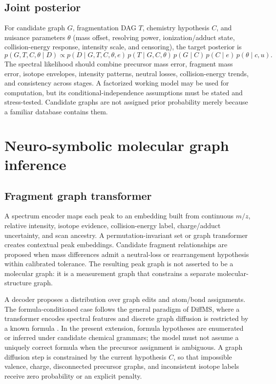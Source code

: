 \documentclass[10pt,a4paper]{article}
\begin{document}
\subsection{Joint posterior}
For candidate graph $G$, fragmentation DAG $T$, chemistry hypothesis $C$, and nuisance parameters $\theta$ (mass offset, resolving power, ionization/adduct state, collision-energy response, intensity scale, and censoring), the target posterior is
\begin{equation}
 p(G,T,C,\theta\mid D) \propto p(D\mid G,T,C,\theta,e)\,p(T\mid G,C,\theta)\,p(G\mid C)\,p(C\mid e)\,p(\theta\mid c,u).
 \label{eq:joint}
\end{equation}
The spectral likelihood should combine precursor mass error, fragment mass error, isotope envelopes, intensity patterns, neutral losses, collision-energy trends, and consistency across stages. A factorized working model may be used for computation, but its conditional-independence assumptions must be stated and stress-tested. Candidate graphs are not assigned prior probability merely because a familiar database contains them.

\section{Neuro-symbolic molecular graph inference}
\subsection{Fragment graph transformer}
A spectrum encoder maps each peak to an embedding built from continuous $m/z$, relative intensity, isotope evidence, collision-energy label, charge/adduct uncertainty, and scan ancestry. A permutation-invariant set or graph transformer creates contextual peak embeddings. Candidate fragment relationships are proposed when mass differences admit a neutral-loss or rearrangement hypothesis within calibrated tolerance. The resulting peak graph is not asserted to be a molecular graph: it is a measurement graph that constrains a separate molecular-structure graph.

A decoder proposes a distribution over graph edits and atom/bond assignments. The formula-conditioned case follows the general paradigm of DiffMS, where a transformer encodes spectral features and discrete graph diffusion is restricted by a known formula \cite{Bohde2025}. In the present extension, formula hypotheses are enumerated or inferred under candidate chemical grammars; the model must not assume a uniquely correct formula when the precursor assignment is ambiguous. A graph diffusion step is constrained by the current hypothesis $C$, so that impossible valence, charge, disconnected precursor graphs, and inconsistent isotope labels receive zero probability or an explicit penalty.
\end{document}
